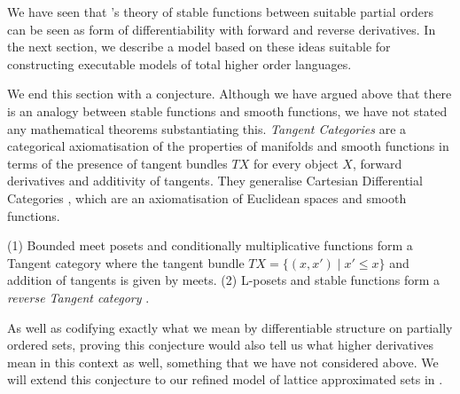 We have seen that \citet{berry79}'s theory of stable functions between suitable partial orders can be seen as form of differentiability with forward and reverse derivatives. In the next section, we describe a model based on these ideas suitable for constructing executable models of total higher order languages.

We end this section with a conjecture. Although we have argued above
that there is an analogy between stable functions and smooth
functions, we have not stated any mathematical theorems substantiating
this. \emph{Tangent Categories} \cite{cockett14,cockett18} are a
categorical axiomatisation of the properties of manifolds and smooth
functions in terms of the presence of tangent bundles $TX$ for every
object $X$, forward derivatives and additivity of tangents. They
generalise Cartesian Differential Categories \cite{cdcs}, which are an
axiomatisation of Euclidean spaces and smooth functions.

\begin{conjecture}
  \label{con:tangent-stable-fns}
  (1) Bounded meet posets and conditionally multiplicative functions
  form a Tangent category where the tangent bundle
  $TX = \{(x,x') \mid x' \leq x\}$ and addition of tangents is given
  by meets. (2) L-posets and stable functions form a \emph{reverse
    Tangent category} \cite{reverse-tangents}.
\end{conjecture}

As well as codifying exactly what we mean by differentiable structure
on partially ordered sets, proving this conjecture would also tell us
what higher derivatives mean in this context as well, something that
we have not considered above. We will extend this conjecture to our
refined model of lattice approximated sets in .


